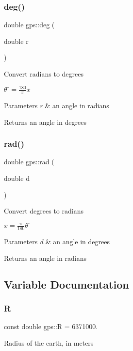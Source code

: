 \subsubsection{\texorpdfstring{deg()}{deg()}}
{\footnotesize\ttfamily double gps\+::deg (\begin{DoxyParamCaption}\item[{double}]{r }\end{DoxyParamCaption})}

Convert radians to degrees

$ \theta^\circ = \frac{180}{\pi} x $


\begin{DoxyParams}{Parameters}
{\em r} & an angle in radians \\
\hline
\end{DoxyParams}
\begin{DoxyReturn}{Returns}
an angle in degrees 
\end{DoxyReturn}
\mbox{\label{namespacegps_ad44ea39876137fc96774486e3a60f004}} 
\subsubsection{\texorpdfstring{rad()}{rad()}}
{\footnotesize\ttfamily double gps\+::rad (\begin{DoxyParamCaption}\item[{double}]{d }\end{DoxyParamCaption})}

Convert degrees to radians

$ x = \frac{\pi}{180} \theta^\circ $


\begin{DoxyParams}{Parameters}
{\em d} & an angle in degrees \\
\hline
\end{DoxyParams}
\begin{DoxyReturn}{Returns}
an angle in radians 
\end{DoxyReturn}


\subsection{Variable Documentation}
\mbox{\label{namespacegps_a336bcadf804afba736e0cf773b5a36e8}} 
\subsubsection{\texorpdfstring{R}{R}}
{\footnotesize\ttfamily const double gps\+::R = 6371000.}

Radius of the earth, in meters 